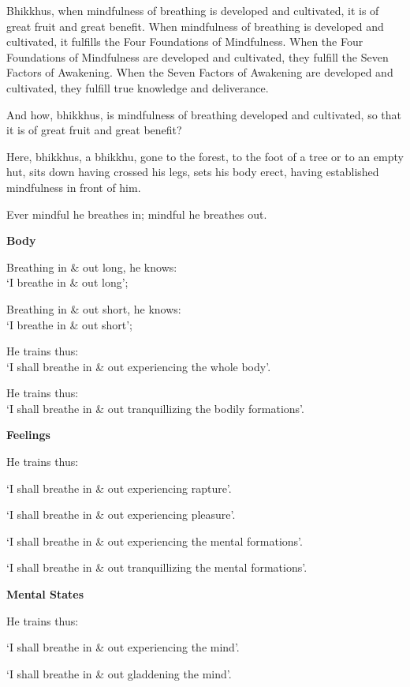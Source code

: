 {
\setlength{\parindent}{0pt}\setlength{\parskip}{5pt}
\fontsize{9.5}{14}\selectfont

Bhikkhus, when mindfulness of breathing is developed and cultivated, it is of great fruit and great benefit.
When mindfulness of breathing is developed and cultivated, it fulfills the Four Foundations of Mindfulness.
When the Four Foundations of Mindfulness are developed and cultivated, they fulfill the Seven Factors of Awakening.
When the Seven Factors of Awakening are developed and cultivated, they fulfill true knowledge and deliverance.

And how, bhikkhus, is mindfulness of breathing developed and cultivated, so that it is of great fruit and great benefit?

Here, bhikkhus, a bhikkhu, gone to the forest, to the foot of a tree or to an
empty hut, sits down having crossed his legs, sets his body erect, having
established mindfulness in front of him.

Ever mindful he breathes in; mindful he breathes out.

\textbf{Body}

Breathing in \& out long, he knows:\\ `I breathe in \& out long';

Breathing in \& out short, he knows:\\ `I breathe in \& out short';

He trains thus:\\ `I shall breathe in \& out experiencing the whole body'.

He trains thus:\\ `I shall breathe in \& out tranquillizing the bodily formations'.

\clearpage

\textbf{Feelings}

He trains thus:

`I shall breathe in \& out experiencing rapture'.

`I shall breathe in \& out experiencing pleasure'.

`I shall breathe in \& out experiencing the mental formations'.

`I shall breathe in \& out tranquillizing the mental formations'.

\textbf{Mental States}

He trains thus:

`I shall breathe in \& out experiencing the mind'.

`I shall breathe in \& out gladdening the mind'.

}
